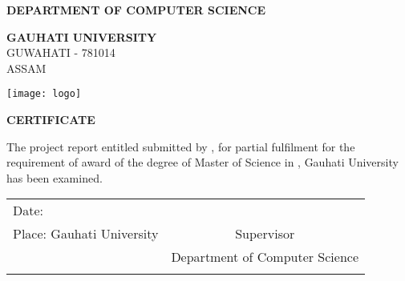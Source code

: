 \cleardoublepage
\thispagestyle{empty}

\begin{center}
 \textbf{\large DEPARTMENT OF COMPUTER SCIENCE}

  \vspace{0.2cm}
 \textbf{\LARGE GAUHATI UNIVERSITY}\\
 {\large GUWAHATI - 781014}\\
 {\large ASSAM}

 \vspace{1cm}

 \texttt{[image: logo]}

 \vspace{2cm}

 \textbf{\large CERTIFICATE}

 \vspace{2cm}

\end{center}

The project report entitled \textbf{\thesistitle} submitted by \textbf{\name}, for partial fulfilment for the requirement of award of the degree of Master of Science in \textbf{\degree}, Gauhati University has been examined.


 \vspace{5cm}

\begin{tabular}{p{8cm} c}
Date:	 \submissiondate & \supervisor \\
Place: Gauhati University	& Supervisor \\
	&	Department of Computer Science \\
	&	\\
\end{tabular}

